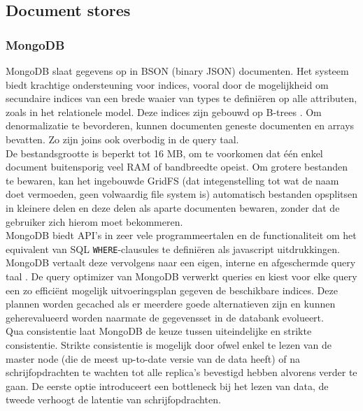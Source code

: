 \begin{landscape}

\label{survey_tabel}
\end{landscape}

\subsection{Document stores}

\subsubsection{MongoDB}

MongoDB slaat gegevens op in BSON (binary JSON) documenten. Het systeem biedt krachtige ondersteuning voor indices, vooral door de mogelijkheid om secundaire indices van een brede waaier van types te defini\"eren op alle attributen, zoals in het relationele model. Deze indices zijn gebouwd op B-trees \cite{mongodb_indexes}. Om denormalizatie te bevorderen, kunnen documenten geneste documenten en arrays bevatten. Zo zijn joins ook overbodig in de query taal.\\
De bestandsgrootte is beperkt tot 16 MB, om te voorkomen dat \'e\'en enkel document buitensporig veel RAM of bandbreedte opeist. Om grotere bestanden te bewaren, kan het ingebouwde GridFS (dat integenstelling tot wat de naam doet vermoeden, geen volwaardig file system is) automatisch bestanden opsplitsen in kleinere delen en deze delen als aparte documenten bewaren, zonder dat de gebruiker zich hierom moet bekommeren.\\
MongoDB biedt API's in zeer vele programmeertalen en de functionaliteit om het equivalent van SQL \texttt{WHERE}-clausules te defini\"eren als javascript uitdrukkingen. MongoDB vertaalt deze vervolgens naar een eigen, interne en afgeschermde query taal \cite{grolinger2013data}. De query optimizer van MongoDB verwerkt queries en kiest voor elke query een zo effici\"ent mogelijk uitvoeringsplan gegeven de beschikbare indices. Deze plannen worden gecached als er meerdere goede alternatieven zijn en kunnen geherevalueerd worden naarmate de gegevensset in de databank evolueert.\\
Qua consistentie laat MongoDB de keuze tussen uiteindelijke en strikte consistentie. Strikte consistentie is mogelijk door ofwel enkel te lezen van de master node (die de meest up-to-date versie van de data heeft) of na schrijfopdrachten te wachten tot alle replica's bevestigd hebben alvorens verder te gaan. De eerste optie introduceert een bottleneck bij het lezen van data, de tweede verhoogt de latentie van schrijfopdrachten.\\
